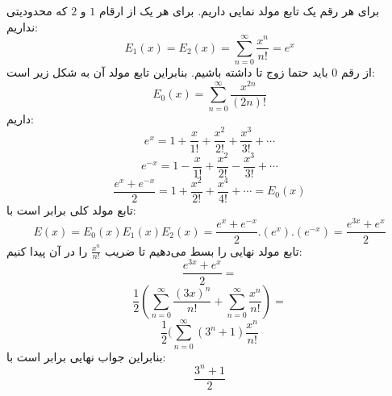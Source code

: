 \p
برای هر رقم یک تابع مولد نمایی داریم. برای هر یک از ارقام
$1$
و 
$2$
که محدودیتی نداریم:
$$E_1(x) = E_2(x) = \sum\limits_{n=0}^{\infty}\frac{x^n}{n!} = e^x$$
از رقم
$0$
باید حتما زوج تا داشته باشیم. بنابراین تابع مولد آن به شکل زیر است:
$$E_0(x) = \sum\limits_{n=0}^{\infty}\frac{x^{2n}}{(2n)!}$$
داریم:
$$e^x = 1 + \frac{x}{1!} + \frac{x^2}{2!} + \frac{x^3}{3!} + \cdots$$
$$e^{-x} = 1 - \frac{x}{1!} + \frac{x^2}{2!} - \frac{x^3}{3!} + \cdots$$
$$\frac{e^x + e^{-x}}{2} = 1 + \frac{x^2}{2!} + \frac{x^4}{4!} + \cdots = E_0(x)$$
تابع مولد کلی برابر است با:
$$E(x) = E_0(x)E_1(x)E_2(x) = \frac{e^x + e^{-x}}{2}.(e^x).(e^{-x}) = \frac{e^{3x} + e^x}{2}$$
تابع مولد نهایی را بسط می‌دهیم تا ضریب 
$\frac{x^n}{n!}$
را در آن پیدا کنیم:
$$\frac{e^{3x} + e^x}{2} = $$
$$\frac{1}{2}(\sum\limits_{n=0}^{\infty}\frac{(3x)^n}{n!} + \sum\limits_{n=0}^{\infty}\frac{x^n}{n!}) = $$
$$\frac{1}{2}(\sum\limits_{n=0}^{\infty}(3^n + 1)\frac{x^n}{n!}$$
بنابراین جواب نهایی برابر است با:
$$\frac{3^n+1}{2}$$

